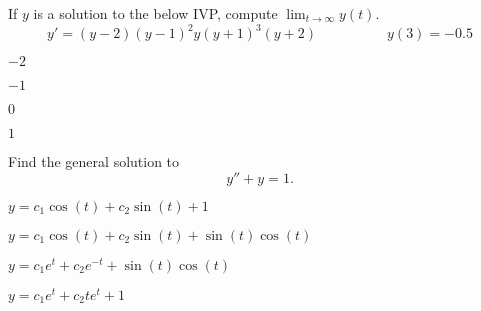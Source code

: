 \begin{readinessAssuranceTest}
\item %
If \(y\) is a solution to the below IVP, compute \(\displaystyle \lim _{t \rightarrow \infty} y(t)\).
\[ y'=(y-2)(y-1)^2y(y+1)^3(y+2) \hspace{5em} y(3)=-0.5\]
\begin{multicols}{4}
\begin{readinessAssuranceTestChoices}
\item \(-2\) 
\item \(-1\) 
\item \(0\) %
\item \(1\) 
\end{readinessAssuranceTestChoices}
\end{multicols}
\vfill

\item %
Find the general solution to \[y''+y=1.\]
\begin{multicols}{2}
\begin{readinessAssuranceTestChoices}
\item \(y=c_1\cos(t)+c_2\sin(t)+1\) %
\item \(y=c_1\cos(t)+c_2\sin(t)+\sin(t)\cos(t)\)
\item \(y=c_1e^t+c_2e^{-t}+\sin(t)\cos(t)\)
\item \(y=c_1e^t+c_2te^t+1\)
\end{readinessAssuranceTestChoices}
\end{multicols}
\vfill




\end{readinessAssuranceTest}
